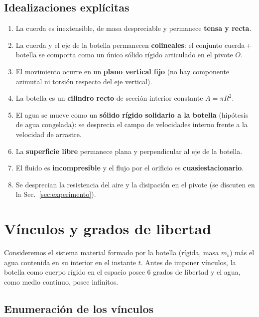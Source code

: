 \documentclass[11pt,a4paper]{article}
\begin{document}
\subsection{Idealizaciones explícitas}
\label{sec:ideal}

\begin{enumerate}[label=\textbf{I\arabic*.},leftmargin=*,itemsep=2pt]
\item La cuerda es inextensible, de masa despreciable y permanece \textbf{tensa y recta}.
\item La cuerda y el eje de la botella permanecen \textbf{colineales}: el conjunto
cuerda\,+\,botella se comporta como un único sólido rígido articulado en el pivote $O$.
\item El movimiento ocurre en un \textbf{plano vertical fijo} (no hay componente azimutal ni
torsión respecto del eje vertical).
\item La botella es un \textbf{cilindro recto} de sección interior constante $A=\pi R^2$.
\item El agua se mueve como un \textbf{sólido rígido solidario a la botella} (hipótesis de agua
congelada): se desprecia el campo de velocidades interno frente a la velocidad de arrastre.
\item La \textbf{superficie libre} permanece plana y perpendicular al eje de la botella.
\item El fluido es \textbf{incompresible} y el flujo por el orificio es \textbf{cuasiestacionario}.
\item Se desprecian la resistencia del aire y la disipación en el pivote (se discuten en la
Sec.~\ref{sec:experimento}).
\end{enumerate}

\section{Vínculos y grados de libertad}

Consideremos el sistema material formado por la botella (rígida, masa $m_b$) más el agua contenida
en su interior en el instante $t$. Antes de imponer vínculos, la botella como cuerpo rígido en el
espacio posee $6$ grados de libertad y el agua, como medio continuo, posee infinitos.

\subsection{Enumeración de los vínculos}
\end{document}
